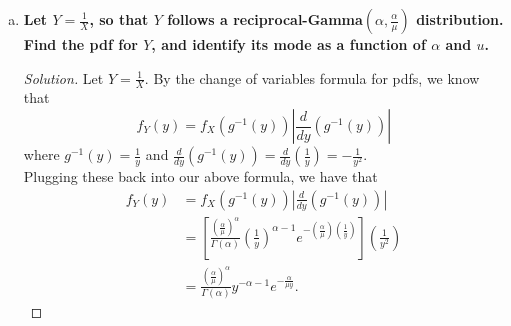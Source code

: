 \documentclass[11pt]{article}
\newenvironment{solution}
  {\renewcommand\qedsymbol{$\blacksquare$}\begin{proof}[Solution]}
  {\end{proof}}
\begin{document}
\begin{enumerate}
\begin{enumerate}[a)]
\begin{solution}
        $f_X(x)$ is maximized when $\ln(f_X(x))$ is maximized. For convenience, let $\ell(x)$ denote $\ln(f_X(x))$. Note that 
        \[
            \ell(x) = \ln(f_X(x)) = \ln \left( \frac{\left( \frac{\alpha}{\mu} \right)^{\alpha} }{\Gamma(\alpha)} \right) + (\alpha - 1) \ln(x) - \left( \frac{\alpha}{\mu} \right)x. 
        \]
        We take the derivative of $\ell(x)$ and set it to $0$ to solve for the maximum:
        \[
            \ell^{\prime}(x) = \frac{\alpha - 1}{x} - \frac{\alpha}{\mu}.
        \]

        Note that $\ell^{\prime}(x) = 0$ when $\frac{\alpha - 1}{x} = \frac{\alpha}{\mu}$. Solving for $x$, we find that $x = \frac{\mu(\alpha - 1)}{\alpha}$. \\

        However, note that this is the mode only when $\alpha > 1$ (for which $x > 0$); when $\alpha \leq 1$, the mode occurs at $x=0$. Thus, the mode of the pdf for $X$ as a function of $\alpha$ and $\mu$ is

            \[
                \boxed{
                    x = \begin{cases}
                        0 &\text{ if } \alpha \leq 1  ;\\
                        \frac{\mu(\alpha - 1)}{\alpha}  &\text{ if } \alpha > 1
                    \end{cases}
                } \qedhere
            \]
        \end{solution}

        \item \textbf{Let $Y = \frac{1}{X}$, so that $Y$ follows a reciprocal-Gamma$\left( \alpha, \frac{\alpha}{\mu} \right)$ distribution. Find the pdf for $Y$,
        and identify its mode as a function of $\alpha$ and $u$.}

        \begin{solution}
        Let $Y = \frac{1}{X}$. By the change of variables formula for pdfs, we know that
        \[
            f_Y(y) = f_X(g^{-1}(y)) \left| \frac{d}{dy} \left( g^{-1}(y) \right) \right|
        \]
        where $g^{-1}(y) = \frac{1}{y}$ and $\frac{d}{dy} \left( g^{-1}(y) \right) = \frac{d}{dy} \left( \frac{1}{y} \right) = -\frac{1}{y^2}$. \\
        
        Plugging these back into our above formula, we have that
        \begin{align*}
            f_Y(y) &= f_X(g^{-1}(y)) \left| \frac{d}{dy} \left( g^{-1}(y) \right) \right| \\
            &= \left[ \frac{\left( \frac{\alpha}{\mu} \right)^{\alpha} }{\Gamma(\alpha)} \left( \frac{1}{y} \right)^{\alpha - 1} e^{-\left( \frac{\alpha}{\mu} \right)\left(\frac{1}{y} \right) } \right] \left( \frac{1}{y^2} \right) \\
            &= \frac{\left( \frac{\alpha}{\mu} \right)^{\alpha} }{\Gamma(\alpha)} y^{-\alpha - 1} e^{- \frac{\alpha}{\mu y} }. 
        \end{align*}


\end{solution}
\end{enumerate}
\end{enumerate}
\end{document}
